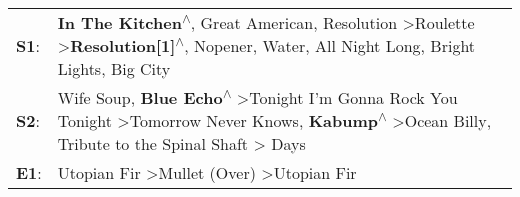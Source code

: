\begin{supertabular}{p{0.03\textwidth}p{0.92\textwidth}}
 \textbf{S1}:  &            \textbf{In The Kitchen\textsuperscript{$\wedge$}}, \enspace Great American\textsuperscript{}, \enspace Resolution\textsuperscript{} \textgreater \enspace Roulette\textsuperscript{} \textgreater \enspace \textbf{Resolution[1]\textsuperscript{$\wedge$}}, \enspace Nopener\textsuperscript{}, \enspace Water\textsuperscript{}, \enspace All Night Long\textsuperscript{}, \enspace Bright Lights, Big City\textsuperscript{}  \enspace  \\
 \textbf{S2}:  &  Wife Soup\textsuperscript{}, \enspace \textbf{Blue Echo\textsuperscript{$\wedge$}} \textgreater \enspace Tonight I'm Gonna Rock You Tonight\textsuperscript{} \textgreater \enspace Tomorrow Never Knows\textsuperscript{}, \enspace \textbf{Kabump\textsuperscript{$\wedge$}} \textgreater \enspace Ocean Billy\textsuperscript{}, \enspace Tribute to the Spinal Shaft\textsuperscript{} \textgreater {} Days\textsuperscript{}  \enspace  \\
 \textbf{E1}:  &                                                                                                                                                                                                                                                                                                     Utopian Fir\textsuperscript{} \textgreater \enspace Mullet (Over)\textsuperscript{} \textgreater \enspace Utopian Fir\textsuperscript{}  \enspace  \\
\end{supertabular}
